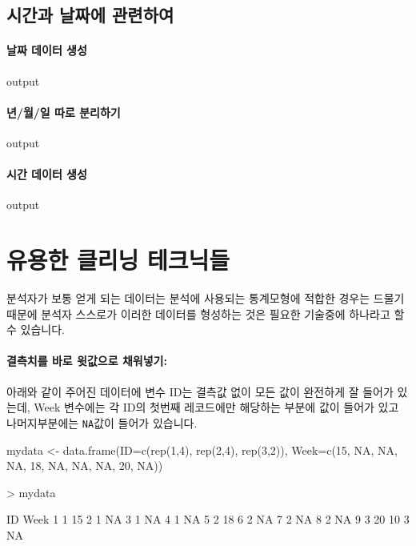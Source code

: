 \documentclass{report}
\begin{document}
\subsection{시간과 날짜에 관련하여}

\paragraph{날짜 데이터 생성}
\begin{Schunk}
\begin{Soutput}
output
\end{Soutput}
\end{Schunk}

\paragraph{년/월/일 따로 분리하기}
\begin{Schunk}
\begin{Soutput}
output
\end{Soutput}
\end{Schunk}

\paragraph{시간 데이터 생성}
\begin{Schunk}
\begin{Soutput}
output
\end{Soutput}
\end{Schunk}


\section{유용한 클리닝 테크닉들}

분석자가 보통 얻게 되는 데이터는 분석에 사용되는 통계모형에 적합한 경우는 드물기 때문에 분석자 스스로가 이러한 데이터를 형성하는 것은 필요한 기술중에 하나라고 할 수 있습니다.
% 

\paragraph{결측치를 바로 윗값으로 채워넣기: } 아래와 같이 주어진 데이터에 변수 ID는 결측값 없이 모든 값이 완전하게 잘 들어가 있는데, Week 변수에는 각 ID의 첫번째 레코드에만 해당하는 부분에 값이 들어가 있고 나머지부분에는 \texttt{NA}값이 들어가 있습니다. 

\begin{Schunk}
\begin{Soutput}
mydata <- data.frame(ID=c(rep(1,4), rep(2,4), rep(3,2)), Week=c(15, NA, NA, NA, 18, NA, NA, NA, 20, NA))

> mydata		

   ID Week
1   1   15
2   1   NA
3   1   NA
4   1   NA
5   2   18
6   2   NA
7   2   NA
8   2   NA
9   3   20
10  3   NA
\end{Soutput}
\end{Schunk}
\end{document}
